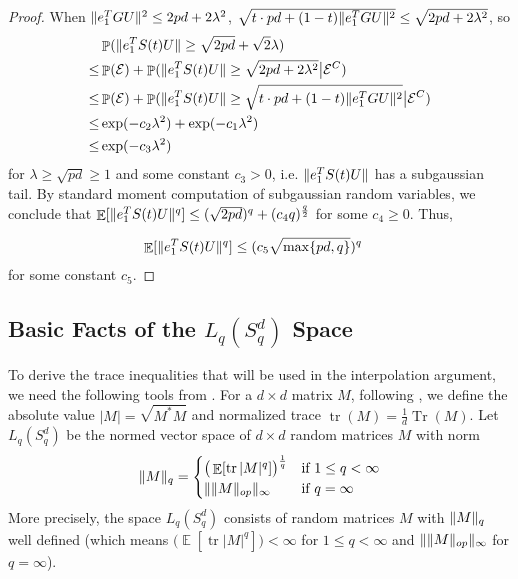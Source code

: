 \documentclass[11pt]{amsart}
\numberwithin{equation}{section}
\numberwithin{equation}{section}
\DeclareMathOperator{\E}{\mathbb{E}}
\DeclareMathOperator{\Pb}{\mathbb{P}}
\DeclareMathOperator*{\tr}{tr}
\DeclareMathOperator*{\Tr}{Tr}
\DeclarePairedDelimiter{\norm}{\lVert}{\rVert}
\theoremstyle{remark}
\theoremstyle{definition}
\begin{document}
\begin{proof}
When $\norm{e_{1}^TGU}^2 \le 2pd + 2\lambda^2$, $\sqrt{t\cdot pd + (1-t)\norm{e_{1}^TGU}^2} \le \sqrt{2pd + 2\lambda^2}$, so
\begin{align*}
    &\Pb ( \norm{e_{1}^TS(t)U} \ge \sqrt{2pd} + \sqrt{2}\lambda ) \\
    \le& \Pb(\mathcal{E}) + \Pb ( \norm{e_{1}^TS(t)U} \ge \sqrt{2pd + 2\lambda^2} \big\vert \mathcal{E}^C ) \\
    \le& \Pb(\mathcal{E}) + \Pb ( \norm{e_{1}^TS(t)U} \ge \sqrt{t\cdot pd + (1-t)\norm{e_{1}^TGU}^2} \big\vert \mathcal{E}^C  ) \\
    \le& \exp(-c_2\lambda^2) + \exp(-c_1\lambda^2) \\
    \le& \exp(-c_3\lambda^2)
\end{align*}
for $\lambda \ge \sqrt{pd} \ge 1$ and some constant $c_3>0$, i.e. $\norm{e_{1}^TS(t)U}$ has a subgaussian tail. By standard moment computation of subgaussian random variables, we conclude that $\E[ \norm{e_{1}^TS(t)U}^q ] \le (\sqrt{2pd})^q + (c_4q)^\frac{q}{2}$ for some $c_4\ge 0$. Thus,

\begin{align*}
    \E[ \norm{e_{1}^TS(t)U}^q ] &\le (c_5\sqrt{\max\{pd,q\}})^q 
\end{align*}
for some constant $c_5$.

\end{proof}

\subsection{Basic Facts of the $L_q(S_q^d)$ Space}

To derive the trace inequalities that will be used in the interpolation argument, we need the following tools from \cite{brailovskaya2022universality}. For a $d \times d$ matrix $M$, following \cite{brailovskaya2022universality}, we define the absolute value $|M|=\sqrt{M^*M}$ and normalized trace $\tr(M)=\frac {1}{d}\Tr(M)$. Let $L_q(S_q^d)$ be the normed vector space of $d\times d$ random matrices $M$ with norm
\begin{align*}
	\norm{M}_q = \begin{cases}
	\big(\E[\tr |M|^q]\big)^{\frac{1}{q}} & \text{if }1\le q<\infty\\
	\| \norm{M}_{op} \|_\infty & \text{if }q=\infty
	\end{cases}
\end{align*}
More precisely, the space $L_q(S_q^d)$ consists of random matrices $M$ with $\norm{M}_q$ well defined (which means $\big(\E[\tr |M|^q]\big)<\infty$ for $1\le q<\infty$ and $\| \norm{M}_{op} \|_\infty$ for $q=\infty$).
\end{document}
